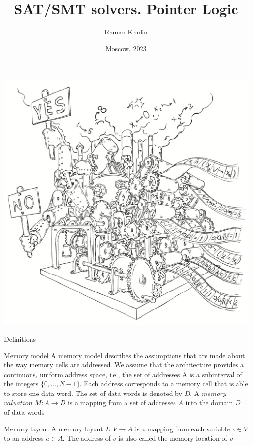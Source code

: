 \documentclass{beamer}
\begin{document}
\title{SAT/SMT solvers. Pointer Logic}
\author{Roman Kholin}
\date{Moscow, 2023}

\begin{frame}
\includegraphics[scale=0.5]{../decision-procedure.png}
\end{frame}

\frame{\titlepage}

\begin{frame}{Definitions}
\begin{block}{Memory model}
A memory model describes the assumptions that are made about the way memory cells are addressed. We assume that the architecture provides a continuous, uniform address space, i.e., the set of addresses A is a subinterval of the integers $\{0, \dots, N - 1\}$. Each address corresponds to a memory cell that is able to store one data word. The set of data words is denoted by $D$. A $memory$ $valuation$ $M : A \rightarrow D$ is a mapping from a set of addresses $A$ into the domain $D$ of data words
\end{block}
\begin{block}{Memory layout}
A memory layout $L : V \rightarrow A$ is a mapping from each variable $v \in V$ to an address $a \in A$. The address of $v$ is also called the memory location of $v$
\end{block}
\end{frame}
\end{document}
